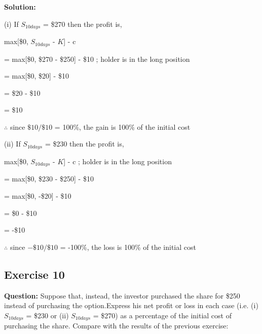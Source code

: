 \documentclass{article}
\begin{document}
\textbf{Solution:}

(i)
If $S_{10 days}$ = \$270 then the profit is,

\vspace{\baselineskip}

max[\$0, $S_{10 days}$ - $K$] - c

\vspace{\baselineskip}

= max[\$0, \$270 - \$250] - \$10 ; holder is in the long position 

\vspace{\baselineskip}

= max[\$0, \$20] - \$10

\vspace{\baselineskip}

= \$20 - \$10

\vspace{\baselineskip}

= \$10

$\therefore$ since $\$10 / \$10$ = 100\%, the gain is 100\% of the initial cost 
\vspace{\baselineskip}

(ii)
If $S_{10 days}$ = \$230 then the profit is,

\vspace{\baselineskip}

max[\$0, $S_{10 days}$ - $K$] - c ; holder is in the long position 

\vspace{\baselineskip}

= max[\$0, \$230 - \$250] - \$10

\vspace{\baselineskip}

= max[\$0, -\$20] - \$10

\vspace{\baselineskip}

= \$0 - \$10

\vspace{\baselineskip}

= -\$10

$\therefore$ since $-\$10 / \$10$ = -100\%, the loss is 100\% of the initial cost 

\subsection*{Exercise 10}

\textbf{Question:} Suppose that, instead, the investor purchased the share for \$250 instead of purchasing the option.Express his net profit or loss in each case (i.e. (i) $S_{10 days}$ = \$230 or (ii) $S_{10 days}$ = \$270) as a percentage of the initial cost of purchasing the share. Compare with the results of the previous exercise:
\end{document}
